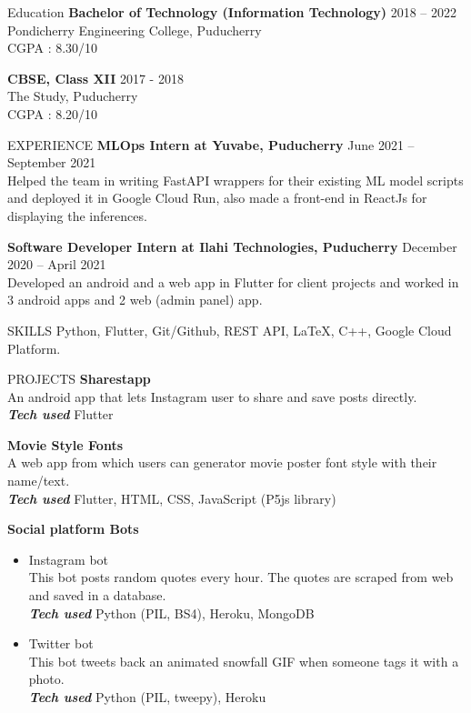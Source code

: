\documentclass{template}
\begin{document}
\begin{rSection}{Education}
{\bf Bachelor of Technology (Information Technology)} \hfill {2018 – 2022}
\\ 
Pondicherry Engineering College, Puducherry \\
CGPA : 8.30/10

{\textbf{CBSE, Class XII}} \hfill 2017 - 2018\\
The Study, Puducherry \\
CGPA : 8.20/10

\end{rSection}

\begin{rSection}{EXPERIENCE}
\textbf{MLOps Intern at Yuvabe, Puducherry} \hfill June 2021 – September 2021 \\
Helped the team in writing FastAPI wrappers for their existing ML model scripts and deployed it in Google Cloud Run, also made a front-end in ReactJs for displaying the inferences.

\textbf{Software Developer Intern at Ilahi Technologies, Puducherry} \hfill December 2020 – April 2021 \\
Developed an android and a web app in Flutter for client projects and worked in 3 android apps and 2 web (admin panel) app.

\end{rSection} 

\begin{rSection}{SKILLS}
Python, Flutter, Git/Github, REST API, \LaTeX, C++, Google Cloud Platform.

\end{rSection}

\begin{rSection}{PROJECTS}
\textbf{Sharestapp} \\ 
An android app that lets Instagram user to share and save posts directly. \\
\textbf{\textit{Tech used} } Flutter

\textbf{Movie Style Fonts} \\ 
A web app from which users can generator movie poster font style with their name/text. \\
\textbf{\textit{Tech used} } Flutter, HTML, CSS, JavaScript (P5js library)

\textbf{Social platform Bots}
\begin{itemize}
    \item Instagram bot \\
    This bot posts random quotes every hour. The quotes are scraped from web and saved in a database. \\
    \textbf{\textit{Tech used} } Python (PIL, BS4), Heroku, MongoDB
    
    \item Twitter bot \\
    This bot tweets back an animated snowfall GIF when someone tags it with a photo. \\
    \textbf{\textit{Tech used} } Python (PIL, tweepy), Heroku
    
\end{itemize}

\end{rSection} 
\end{document}
